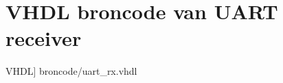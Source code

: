 \section[UART receiver]{VHDL broncode van UART receiver}\label{appdix:rx} 
	\scriptsize
	 VHDL] {broncode/uart_rx.vhdl}
	\normalsize

